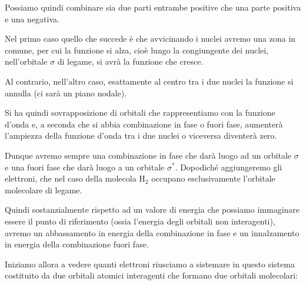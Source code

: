 Possiamo quindi combinare sia due parti entrambe positive che una parte positiva e una negativa.

Nel primo caso quello che succede è che avvicinando i nuclei avremo una zona in comune, per cui la funzione si alza, cioè lungo la congiungente dei nuclei, nell'orbitale $\sigma$ di legame, si avrà la funzione che cresce.

Al contrario, nell'altro caso, esattamente al centro tra i due nuclei la funzione si annulla (ci sarà un piano nodale).

Si ha quindi sovrapposizione di orbitali che rappresentiamo con la funzione d'onda e, a seconda che si abbia combinazione in fase o fuori fase, aumenterà l'ampiezza della funzione d'onda tra i due nuclei o viceversa diventerà zero.

Dunque avremo sempre una combinazione in fase che darà luogo ad un orbitale $\sigma$ e una fuori fase che darà luogo a un orbitale $\sigma^*$. Dopodiché aggiungeremo gli elettroni, che nel caso della molecola H$_2$ occupano esclusivamente l'orbitale molecolare di legame.

Quindi sostanzialmente rispetto ad un valore di energia che possiamo immaginare essere il punto di riferimento (ossia l'energia degli orbitali non interagenti), avremo un abbassamento in energia della combinazione in fase e un innalzamento in energia della combinazione fuori fase.

\vspace{0.2cm}Iniziamo allora a vedere quanti elettroni riusciamo a sistemare in questo sistema costituito da due orbitali atomici interagenti che formano due orbitali molecolari:

